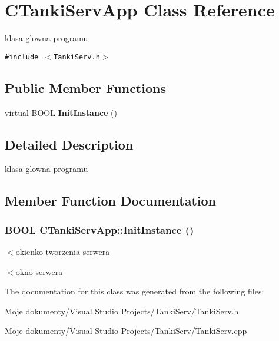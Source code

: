 \section{CTankiServApp Class Reference}
\label{class_c_tanki_serv_app}
klasa glowna programu  


{\tt \#include $<$TankiServ.h$>$}

\subsection*{Public Member Functions}
\begin{CompactItemize}
\item 
virtual BOOL {\bf InitInstance} ()
\end{CompactItemize}


\subsection{Detailed Description}
klasa glowna programu 



\subsection{Member Function Documentation}
\subsubsection{\setlength{\rightskip}{0pt plus 5cm}BOOL CTankiServApp::InitInstance ()\hspace{0.3cm}{\tt  [virtual]}}\label{class_c_tanki_serv_app_7cf7545c716a2cdbd3fafd8d722d1782}




$<$okienko tworzenia serwera

$<$okno serwera 

The documentation for this class was generated from the following files:\begin{CompactItemize}
\item 
Moje dokumenty/Visual Studio Projects/TankiServ/TankiServ.h\item 
Moje dokumenty/Visual Studio Projects/TankiServ/TankiServ.cpp\end{CompactItemize}
